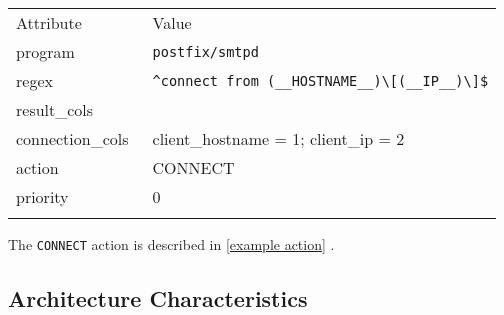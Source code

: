 \documentclass[draft]{svmult}
\newcommand{\sectionref}[1]{%
    \textsection{}\vref*{#1}%
}
\newcommand{\daemon}[1]{%
    \texttt{postfix/#1}%
}
\begin{document}
\begin{tabular}[]{ll}
    \hline
    \noalign{\smallskip}
    Attribute                 & Value                                            \\
    \noalign{\smallskip}
    \hline
    \noalign{\smallskip}
    program                   & \daemon{smtpd}                                   \\
    regex                     & \verb!^connect from (__HOSTNAME__)\[(__IP__)\]$! \\
    result\_cols              &                                                  \\
    connection\_cols~\empty{} & client\_hostname = 1; client\_ip = 2             \\
    action                    & CONNECT                                          \\
    priority                  & 0                                                \\
    \noalign{\smallskip}
    \hline
    \noalign{\smallskip}
\end{tabular}

\noindent{}The \texttt{CONNECT} action is described in \sectionref{example
action}.


\subsection{Architecture Characteristics}

\label{Architecture characteristics}
\end{document}
